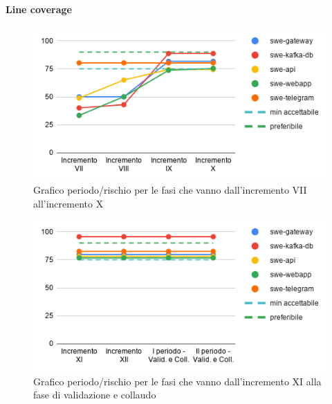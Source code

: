 \paragraph{Line coverage}
	\begin{figure}[H]
			\centering
			\includegraphics[width=0.8\linewidth]{./res/images/QM-TEST-3-LOCO.png}
			\caption{Grafico periodo/rischio per le fasi che vanno dall'incremento VII all'incremento X}
			\label{fig:Grafico periodo/rischio per le fasi che vanno dall'incremento VII all'incremento X}
	\end{figure}
	\begin{figure}[H]
			\centering
			\includegraphics[width=0.8\linewidth]{./res/images/QM-TEST-3-LOCO_1.png}
			\caption{Grafico periodo/rischio per le fasi che vanno dall'incremento XI alla fase di validazione e collaudo}
			\label{fig:Grafico periodo/rischio per le fasi che vanno dall'incremento XI alla fase di validazione e collaudo}
	\end{figure}

